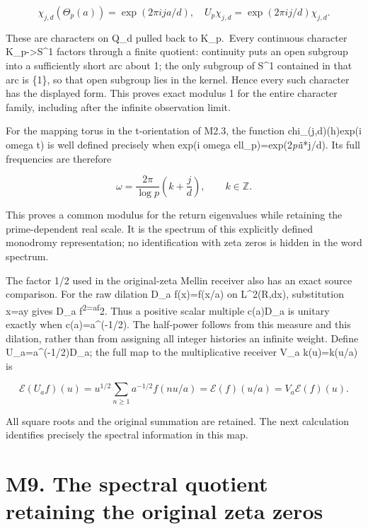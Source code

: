 \[
\chi_{j,d}(\Theta_p(a))=\exp(2\pi i j a/d),
\quad U_p\chi_{j,d}=\exp(2\pi i j/d)\chi_{j,d}.
\tag{M8.1}
\]

These are characters on Q\_d pulled back to K\_p.~Every continuous
character K\_p-\textgreater S\^{}1 factors through a finite quotient:
continuity puts an open subgroup into a sufficiently short arc about 1;
the only subgroup of S\^{}1 contained in that arc is \{1\}, so that open
subgroup lies in the kernel. Hence every such character has the
displayed form. This proves exact modulus 1 for the entire character
family, including after the infinite observation limit.

For the mapping torus in the t-orientation of M2.3, the function
chi\_(j,d)(h)exp(i omega t) is well defined precisely when exp(i omega
ell\_p)=exp(2\emph{pi}i*j/d). Its full frequencies are therefore

\[
\omega=\frac{2\pi}{\log p}\left(k+\frac jd\right),\qquad k\in\mathbb Z.
\tag{M8.2}
\]

This proves a common modulus for the return eigenvalues while retaining
the prime-dependent real scale. It is the spectrum of this explicitly
defined monodromy representation; no identification with zeta zeros is
hidden in the word spectrum.

The factor 1/2 used in the original-zeta Mellin receiver also has an
exact source comparison. For the raw dilation D\_a f(x)=f(x/a) on
L\^{}2(R,dx), substitution x=ay gives \textbar\textbar D\_a
f\textbar\textbar{}\textsuperscript{2=a\textbar\textbar f\textbar\textbar{}}2.
Thus a positive scalar multiple c(a)D\_a is unitary exactly when
c(a)=a\^{}(-1/2). The half-power follows from this measure and this
dilation, rather than from assigning all integer histories an infinite
weight. Define U\_a=a\^{}(-1/2)D\_a; the full map to the multiplicative
receiver V\_a k(u)=k(u/a) is

\[
\mathcal E(U_a f)(u)
=u^{1/2}\sum_{n\ge1}a^{-1/2}f(nu/a)
=\mathcal E(f)(u/a)=V_a\mathcal E(f)(u).
\tag{M8.3}
\]

All square roots and the original summation are retained. The next
calculation identifies precisely the spectral information in this map.

\section{M9. The spectral quotient retaining the original zeta
zeros}\label{m9.-the-spectral-quotient-retaining-the-original-zeta-zeros}

